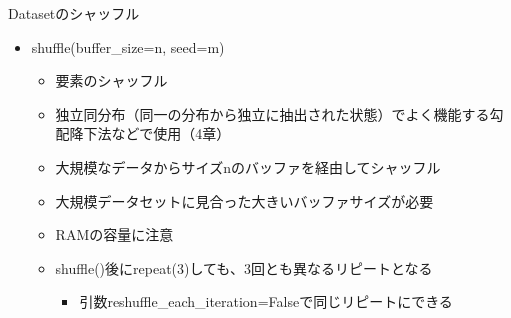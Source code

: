 \documentclass[aspectratio=169, dvipdfmx, 14pt, xcolor={svgnames,dvipsnames}, t]{beamer}
\begin{document}
\begin{frame}{Datasetのシャッフル}

  \begin{itemize}
    \tightlist
    \item
          shuffle(buffer\_size=n, seed=m)

          \begin{itemize}
            \tightlist
            \item
                  要素のシャッフル
            \item
                  独立同分布（同一の分布から独立に抽出された状態）でよく機能する勾配降下法などで使用（4章）
            \item
                  大規模なデータからサイズnのバッファを経由してシャッフル
            \item
                  大規模データセットに見合った大きいバッファサイズが必要
            \item
                  RAMの容量に注意
            \item
                  shuffle()後にrepeat(3)しても、3回とも異なるリピートとなる

                  \begin{itemize}
                    \tightlist
                    \item
                          引数reshuffle\_each\_iteration=Falseで同じリピートにできる
                  \end{itemize}
          \end{itemize}
  \end{itemize}

\end{frame}

\end{document}
